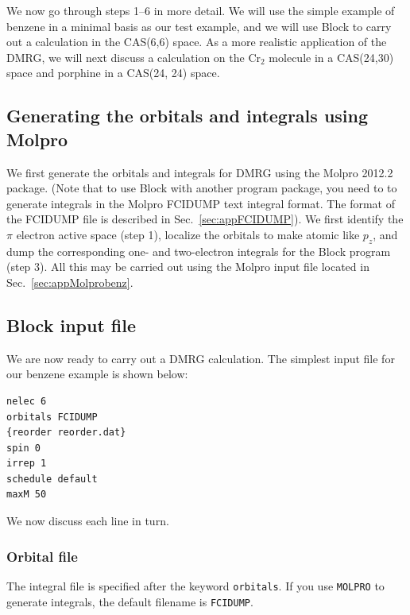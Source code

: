 \documentclass[letterpaper,12pt,aps, pra]{revtex4-1}
\begin{document}
We now go through steps 1--6 in more detail. We will use the simple example of benzene in a minimal basis as our test example, and we will use Block
to carry out a calculation in the CAS(6,6) space. As a more realistic application of the DMRG, we will next discuss a calculation on the Cr$_2$ molecule
in a CAS(24,30) space and porphine in a CAS(24, 24) space.


\subsection{Generating the orbitals and integrals using Molpro}

We first generate the orbitals and integrals for DMRG using the Molpro 2012.2
package.  (Note that to use Block with another program package, you need to to
generate integrals in the Molpro FCIDUMP text integral format. The format of
the FCIDUMP file is described in Sec.~\ref{sec:appFCIDUMP}).  We first identify
the $\pi$ electron active space (step 1), localize the orbitals to make atomic
like $p_z$, and dump the corresponding one- and two-electron integrals for the
Block program (step 3). All this may be carried out using the Molpro input
file located in Sec.~\ref{sec:appMolprobenz}.


\subsection{Block input file}

We are now ready to carry out a DMRG calculation. The simplest input file for our benzene example is shown below:

\begin{verbatim}
nelec 6 
orbitals FCIDUMP
{reorder reorder.dat}
spin 0
irrep 1
schedule default
maxM 50
\end{verbatim}

We now discuss each line in turn.

\subsubsection{Orbital file}
The integral file is specified after the keyword \texttt{orbitals}. 
If you use \texttt{MOLPRO} to generate integrals, the default filename is \texttt{FCIDUMP}.
\end{document}
